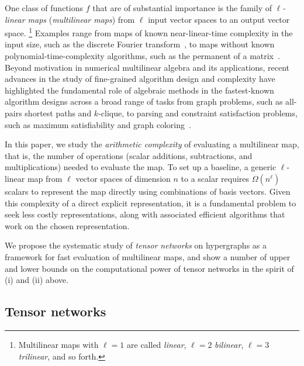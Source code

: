 One class of functions $f$ that are of substantial importance is the family of \emph{$\ell$-linear maps} (\emph{multilinear maps}) from $\ell$ input vector spaces to an output vector space.%
\footnote{Multilinear maps with $\ell=1$ are called \emph{linear}, $\ell=2$ \emph{bilinear}, $\ell=3$ \emph{trilinear}, and so forth.}{}
Examples range from maps of known near-linear-time complexity in the input size, such as the discrete Fourier transform~\cite{CooleyT1965,VanLoan1992}, to maps without known polynomial-time-complexity algorithms, such as the permanent of a matrix~\cite{Ryser1963,Valiant1979}. Beyond motivation in numerical multilinear algebra and its applications, recent advances in the study of fine-grained algorithm design and complexity have highlighted the fundamental role of algebraic methods in the fastest-known algorithm designs across a broad range of tasks from graph problems, such as all-pairs shortest paths and $k$-clique, to parsing and constraint satisfaction problems, such as maximum satisfiability and graph coloring~\cite{AbboudBW15a,BjorklundHKK2008,BjorklundHK2009,EisenbrandG2004,ItaiR1978,Nesetril1985,Williams2005,Williams14apsp}.

In this paper, we study the \emph{arithmetic complexity} of evaluating
a multilinear map, that is, the number of operations (scalar additions,
subtractions, and multiplications) needed to evaluate the map.
To set up a baseline, a generic $\ell$-linear map from $\ell$ vector spaces
of dimension $n$ to a scalar requires $\Omega(n^\ell)$ scalars to represent
the map directly using combinations of basis vectors. Given this
complexity of a direct explicit representation, it is a fundamental
problem to seek less costly representations, along with associated
efficient algorithms that work on the chosen representation.

We propose the systematic study of \emph{tensor networks} on hypergraphs as
a framework for fast evaluation of multilinear maps, and show a number of
upper and lower bounds on the computational power of tensor networks
in the spirit of (i) and (ii) above.


\subsection{Tensor networks}

\label{sect:nets}


